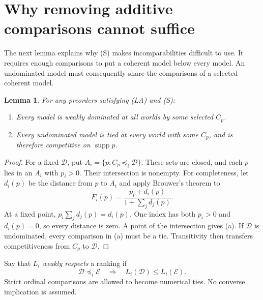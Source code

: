 \documentclass[11pt]{article}
\newtheorem{lemma}[theorem]{Lemma}
\theoremstyle{remark}\newtheorem{remark}[theorem]{Remark}
\newcommand{\Dscr}{\mathcal D}
\newcommand{\Escr}{\mathcal E}
\newcommand{\supp}{\operatorname{supp}}
\begin{document}
\section{Why removing additive comparisons cannot suffice}

The next lemma explains why (S) makes incomparabilities difficult to use.
It requires enough comparisons to put a coherent model below every model.
An undominated model must consequently share the comparisons of a selected
coherent model.

\begin{lemma}\label{lem:complete-class}
For any preorders satisfying (LA) and (S):
\begin{enumerate}[label=(\alph*)]
\item Every model is weakly dominated at all worlds by some selected $C_p$.
\item Every undominated model is tied at every world with some $C_p$,
and is therefore competitive on $\supp p$.
\end{enumerate}
\end{lemma}
\begin{proof}
For a fixed $\Dscr$, put $A_i=\{p:C_p\preceq_i\Dscr\}$.
These sets are closed, and each $p$ lies in an $A_i$ with $p_i>0$.
Their intersection is nonempty. For completeness, let $d_i(p)$ be the
distance from $p$ to $A_i$ and apply Brouwer's theorem to
\[
 F_i(p)=\frac{p_i+d_i(p)}{1+\sum_jd_j(p)}.
\]
At a fixed point, $p_i\sum_jd_j(p)=d_i(p)$. One index has both $p_i>0$
and $d_i(p)=0$, so every distance is zero. A point of the intersection
gives (a). If $\Dscr$ is undominated, every comparison in (a) must be a tie.
Transitivity then transfers competitiveness from $C_p$ to $\Dscr$.
\end{proof}

Say that $L_i$ \emph{weakly respects} a ranking if
\begin{equation}
 \Dscr\preceq_i\Escr\quad\Longrightarrow\quad L_i(\Dscr)\le L_i(\Escr).
 \label{eq:extension}
\end{equation}
Strict ordinal comparisons are allowed to become numerical ties. No
converse implication is assumed.
\end{document}
